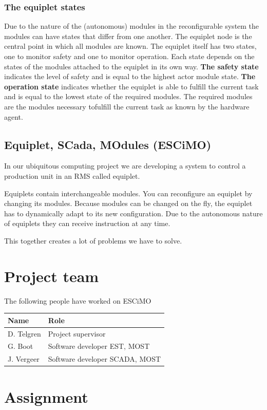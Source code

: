 \documentclass[12pt,a4paper]{report}
\begin{document}
\subsection{The equiplet states}
Due to the nature of the (autonomous) modules in the reconfigurable system the modules can have states that differ from one another. The equiplet node is the central point in which all modules are known. The equiplet itself has two states, one to monitor safety and one to monitor operation. Each state depends on the states of the modules attached to the equiplet in its own
way.
\textbf{The safety state} indicates the level of safety and is equal to the highest actor module state.
\textbf{The operation state} indicates whether the equiplet is able to fulfill the current task and is equal to the lowest state of the required modules. The required modules are the modules necessary tofulfill the current task as known by the hardware agent.\cite{mast_funcional_design}

\section{Equiplet, SCada, MOdules (ESCiMO)}
In our ubiquitous computing project we are developing a system to control a production unit in an RMS called equiplet. 

Equiplets contain interchangeable modules. 
You can reconfigure an equiplet by changing its modules.
Because modules can be changed on the fly, the equiplet has to dynamically adapt to its new configuration.
Due to the autonomous nature of equiplets they can receive instruction at any time.

This together creates a lot of problems we have to solve.


\chapter{Project team}
The following people have worked on ESCiMO

\begin{tabular}{l | l}
Name       & Role \\
\hline
D. Telgren & Project supervisor \\
G. Boot    & Software developer EST, MOST \\
J. Vergeer & Software developer SCADA, MOST
\end{tabular}


\chapter{Assignment}
\end{document}
